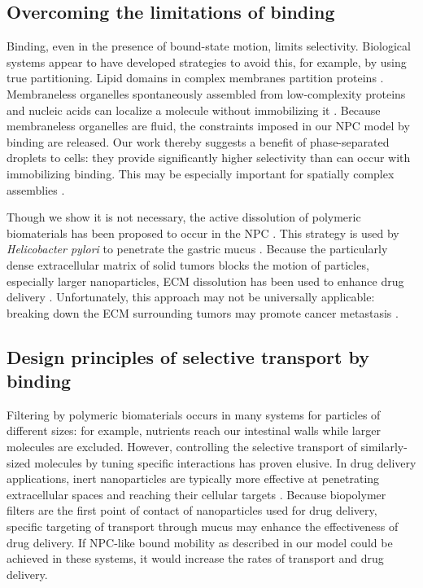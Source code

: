 \subsection{Overcoming the limitations of binding}
Binding, even in the presence of bound-state motion, limits
selectivity.  Biological systems appear to have developed strategies
to avoid this, for example, by using true partitioning.  Lipid domains
in complex membranes partition proteins \cite{simons11}.  Membraneless
organelles spontaneously assembled from low-complexity proteins and
nucleic acids can localize a molecule without immobilizing it
\cite{brangwynne15}.  Because membraneless organelles are fluid, the
constraints imposed in our NPC model by binding are released.  Our
work thereby suggests a benefit of phase-separated droplets to cells:
they provide significantly higher selectivity than can occur with
immobilizing binding. This may be especially important for spatially
complex assemblies \cite{feric16}.

Though we show it is not necessary, the active dissolution of
polymeric biomaterials has been proposed to occur in the NPC
\cite{ribbeck01}. This strategy is used by \textit{Helicobacter
  pylori} to penetrate the gastric mucus \cite{celli09}. Because the
particularly dense extracellular matrix of solid tumors blocks the
motion of particles, especially larger nanoparticles, ECM dissolution
has been used to enhance drug delivery \cite{zhou13}. Unfortunately,
this approach may not be universally applicable: breaking down the ECM
surrounding tumors may promote cancer metastasis \cite{miao15}.

\subsection{Design principles of selective transport by binding}

Filtering by polymeric biomaterials occurs in many systems for
particles of different sizes: for example, nutrients reach our
intestinal walls while larger molecules are excluded.  However,
controlling the selective transport of similarly-sized molecules by
tuning specific interactions has proven elusive. In drug delivery
applications, inert nanoparticles are typically more effective at penetrating
extracellular spaces and reaching their cellular targets
\cite{witten17}. Because biopolymer filters are the first point of
contact of nanoparticles used for drug delivery, specific targeting of
transport through mucus may enhance the effectiveness of drug
delivery. If NPC-like bound mobility as described in our model could
be achieved in these systems, it would increase the rates of
transport and drug delivery. 
